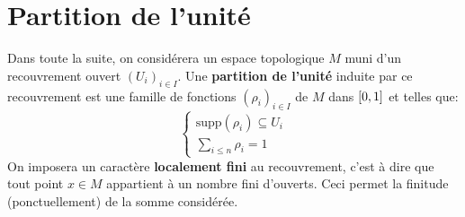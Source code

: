 \section{Partition de l'unité}
Dans toute la suite, on considérera un espace topologique \( M \) muni d'un recouvrement ouvert \((U_i)_{i \in I}\). Une \textbf{partition de l'unité} induite par ce recouvrement est une famille de fonctions \( (\rho_i)_{i \in I} \) de \( M \) dans \( \icc{0}{1} \) et telles que:  
\[ 
   \begin{cases}
      \text{supp}( \rho_i) \subseteq U_i\\
      \sum_{i \leq n} \rho_i = 1
   \end{cases}
\]
On imposera un caractère \textbf{localement fini} au recouvrement, c'est à dire que tout point \(x \in M\) appartient à un nombre fini d'ouverts. Ceci permet la finitude (ponctuellement) de la somme considérée.
